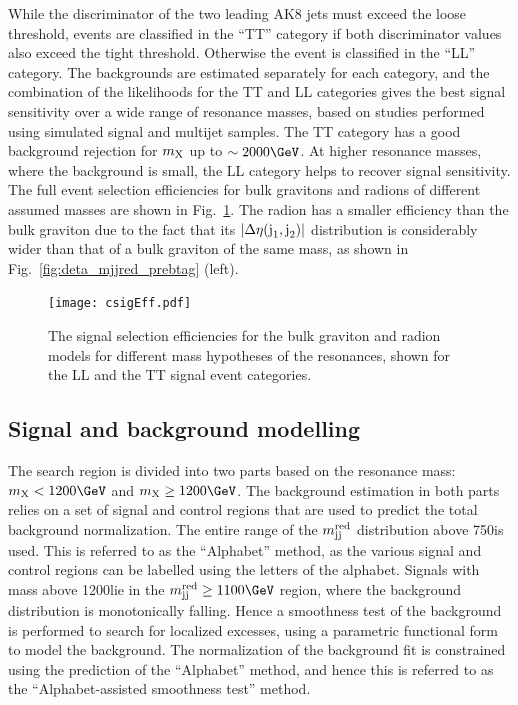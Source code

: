 While the \Hbbt discriminator of the two leading AK8 jets must exceed the
loose threshold, events are classified in the ``TT'' category if both discriminator values also exceed the tight threshold. Otherwise the event is classified in the ``LL'' category.
The backgrounds are estimated separately for each category, and the
combination of the likelihoods for the TT and LL categories gives
the best signal sensitivity over a wide range of resonance masses, based on studies performed using
simulated signal and multijet samples. The TT category has
a good background rejection for $m_{\text{X}}$ up to $\sim 2000\GeV$. At higher
resonance masses,
where the background is small, the LL category helps to recover 
signal sensitivity. The full event selection efficiencies for bulk
gravitons and radions of different assumed masses are shown in
Fig.~\ref{fig:SignalEff}. The radion has a smaller efficiency than the
bulk graviton due to the fact that its $|\Delta\eta(\text{j}_{1}, \text{j}_{2})|$ distribution is
considerably wider than that of a bulk graviton of the same mass, as
shown in Fig.~\ref{fig:deta_mjjred_prebtag} (left).

\begin{figure}[h]
\centering
\texttt{[image: csigEff.pdf]}
\caption{The signal selection efficiencies for the bulk graviton and
  radion models for different mass hypotheses of the resonances, shown
  for the LL and the TT signal event categories.}
\label{fig:SignalEff}
\end{figure}


\subsection{Signal and background modelling\label{sec:SigModelBkgEst}}

The search region is divided into two parts based on the 
resonance mass: $\mx < 1200\GeV$ and $\mx \ge 1200\GeV$. 
The background estimation in both parts relies on a set of
signal and control regions that are used to predict the total background
normalization. The entire range of the $m_{\text{jj}}^{\text{red}}$ distribution above 750\GeV is used. 
This is referred to as the ``Alphabet'' method, as the various signal and control regions can be labelled using the letters of the alphabet.
Signals with mass above 1200\GeV lie in the $\mjjs \ge 1100\GeV$ region, where the background distribution is monotonically falling. Hence a smoothness test of the background is performed to
search for localized excesses, using a parametric functional form to
model the background. The normalization of the background fit is constrained using the prediction of the ``Alphabet'' method, and hence this is referred to as the ``Alphabet-assisted smoothness test'' method.


